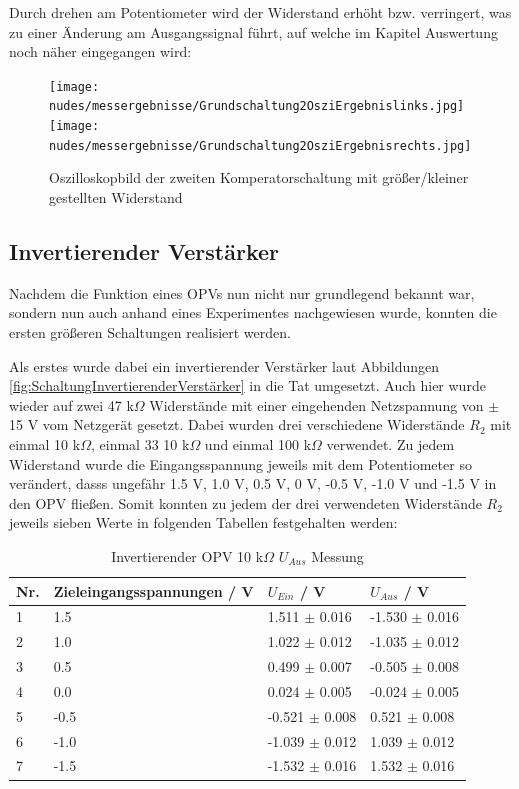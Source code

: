 \documentclass[12pt,a4paper,twoside]{article}
\begin{document}
\noindent
Durch drehen am Potentiometer wird der Widerstand erhöht bzw. verringert, was zu einer Änderung am Ausgangssignal führt, auf welche im Kapitel Auswertung noch näher eingegangen wird:

\begin{figure}[H]
    \centering
    \texttt{[image: nudes/messergebnisse/Grundschaltung2OsziErgebnislinks.jpg]}
    \texttt{[image: nudes/messergebnisse/Grundschaltung2OsziErgebnisrechts.jpg]}
    \caption{Oszilloskopbild der zweiten Komperatorschaltung mit größer/kleiner gestellten Widerstand}
    \label{fig:Grundschaltung2ErgebnissPoti}
\end{figure}

\subsection{Invertierender Verstärker}

Nachdem die Funktion eines OPVs nun nicht nur grundlegend bekannt war, sondern nun auch anhand eines Experimentes nachgewiesen wurde, konnten die ersten größeren Schaltungen realisiert werden. \newline

\noindent
Als erstes wurde dabei ein invertierender Verstärker laut Abbildungen \ref{fig:SchaltungInvertierenderVerstärker} in die Tat umgesetzt. Auch hier wurde wieder auf zwei 47 k$\Omega$ Widerstände mit einer eingehenden Netzspannung von $\pm$ 15 V vom Netzgerät gesetzt.
Dabei wurden drei verschiedene Widerstände $R_{2}$ mit einmal 10 k$\Omega$, einmal 33 10 k$\Omega$ und einmal 100 k$\Omega$ verwendet. Zu jedem Widerstand wurde die Eingangsspannung jeweils mit dem Potentiometer so verändert, dasss ungefähr 1.5 V, 1.0 V, 0.5 V, 0 V, -0.5 V, -1.0 V und -1.5 V in den OPV fließen. 
Somit konnten zu jedem der drei verwendeten Widerstände $R_{2}$ jeweils sieben Werte in folgenden Tabellen festgehalten werden:

\begin{table}[H]
    \centering
    \caption{Invertierender OPV 10 k$\Omega$ $U_{Aus}$ Messung}
    \label{tab:IoVerstärkungenGemessen10}
    \begin{tabular}{| l | l | l | l |}
        \hline
        Nr. & Zieleingangsspannungen / V & $U_{Ein}$ / V & $U_{Aus}$ / V \\
        \hline
        1 &  1.5 &  1.511 $\pm$ 0.016 & -1.530 $\pm$ 0.016 \\
        2 &  1.0 &  1.022 $\pm$ 0.012 & -1.035 $\pm$ 0.012 \\
        3 &  0.5 &  0.499 $\pm$ 0.007 & -0.505 $\pm$ 0.008 \\
        4 &  0.0 &  0.024 $\pm$ 0.005 & -0.024 $\pm$ 0.005 \\
        5 & -0.5 & -0.521 $\pm$ 0.008 &  0.521 $\pm$ 0.008 \\
        6 & -1.0 & -1.039 $\pm$ 0.012 &  1.039 $\pm$ 0.012 \\
        7 & -1.5 & -1.532 $\pm$ 0.016 &  1.532 $\pm$ 0.016 \\
        \hline
    \end{tabular}
\end{table}
\end{document}
